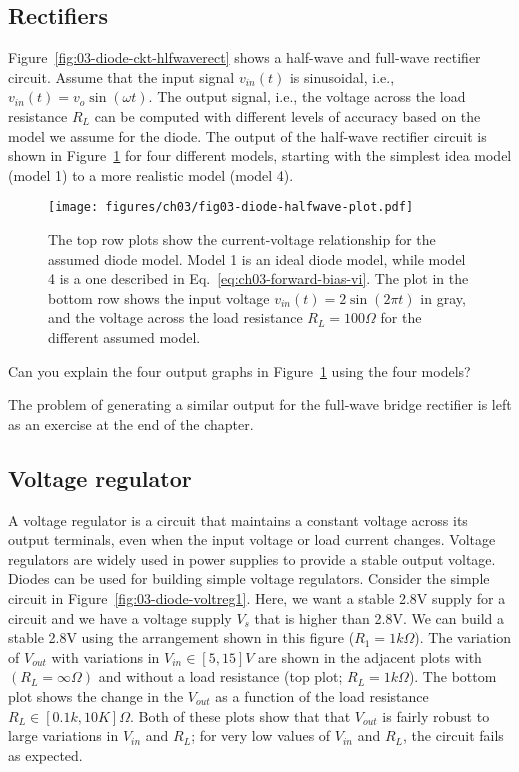 \subsection{Rectifiers}
Figure~\ref{fig:03-diode-ckt-hlfwaverect} shows a half-wave and full-wave rectifier circuit. Assume that the input signal  $v_{in}\left(t\right)$ is sinusoidal, i.e., $v_{in}\left(t\right) = v_o \sin\left(\omega t\right)$. The output signal, i.e., the voltage across the load resistance $R_L$ can be computed with different levels of accuracy based on the model we assume for the diode. The output of the half-wave rectifier circuit is shown in Figure~\ref{fig:03-diode-halfwave-plot} for four different models, starting with the simplest idea model (model 1) to a more realistic model (model 4). 
\begin{figure}[t]
    \centering
    \texttt{[image: figures/ch03/fig03-diode-halfwave-plot.pdf]}
    \caption{The top row plots show the current-voltage relationship for the assumed diode model. Model 1 is an ideal diode model, while model 4 is a one described in Eq.~\ref{eq:ch03-forward-bias-vi}. The plot in the bottom row shows the input voltage $v_{in}\left(t\right) = 2 \sin\left(2\pi t\right)$ in gray, and the voltage across the load resistance $R_L = 100\Omega$ for the different assumed model.}
    \label{fig:03-diode-halfwave-plot}
\end{figure}

\begin{boxedstuff}
    \begin{problem}
        Can you explain the four output graphs in Figure~\ref{fig:03-diode-halfwave-plot} using the four models?
    \end{problem}
\end{boxedstuff}
The problem of generating a similar output for the full-wave bridge rectifier is left as an exercise at the end of the chapter.

\subsection{Voltage regulator}
A voltage regulator is a circuit that maintains a constant voltage across its output terminals, even when the input voltage or load current changes. Voltage regulators are widely used in power supplies to provide a stable output voltage. Diodes can be used for building simple voltage regulators. Consider the simple circuit in Figure~\ref{fig:03-diode-voltreg1}. Here, we want a stable 2.8V supply for a circuit and we have a voltage supply $V_s$ that is higher than 2.8V. We can build a stable 2.8V using the arrangement shown in this figure ($R_1 = 1k\Omega$). The variation of $V_{out}$ with variations in $V_{in} \in [5, 15]V$ are shown in the adjacent plots with $\left(R_L = \infty \Omega\right)$ and without a load resistance (top plot; $R_L = 1k\Omega$). The bottom plot shows the change in the $V_{out}$ as a function of the load resistance $R_L \in [0.1k, 10K]\Omega$. Both of these plots show that that $V_{out}$ is fairly robust to large variations in $V_{in}$ and $R_L$; for very low values of $V_{in}$ and $R_L$, the circuit fails as expected.

